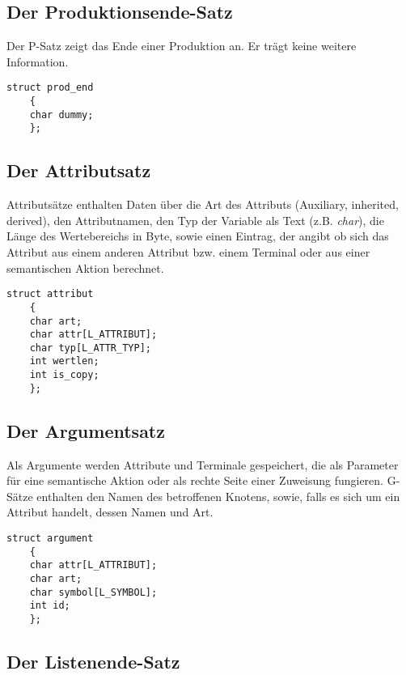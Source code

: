 \subsection{Der Produktionsende-Satz}

Der P-Satz zeigt das Ende einer Produktion an. Er tr\"agt keine weitere Information.

\begin{small}\begin{verbatim}
struct prod_end
	{
	char dummy;
	};
\end{verbatim}\end{small}

\subsection{Der Attributsatz}

Attributs\"atze enthalten Daten \"uber die Art des Attributs (Auxiliary, inherited, derived), den Attributnamen, den Typ der Variable als Text (z.B. {\it
char}), die L\"ange des Wertebereichs in Byte, sowie einen Eintrag, der angibt ob sich das Attribut aus einem anderen Attribut bzw. einem Terminal oder aus
einer semantischen Aktion berechnet.

\begin{small}\begin{verbatim}
struct attribut
	{
	char art;
	char attr[L_ATTRIBUT];
	char typ[L_ATTR_TYP];
	int wertlen;
	int is_copy;
	};
\end{verbatim}\end{small}

\subsection{Der Argumentsatz}

Als Argumente werden Attribute und Terminale gespeichert, die als Parameter f\"ur eine semantische Aktion oder als rechte Seite einer Zuweisung fungieren.
G-S\"atze enthalten den Namen des betroffenen Knotens, sowie, falls es sich um ein Attribut handelt, dessen Namen und Art.

\begin{small}\begin{verbatim}
struct argument
	{
	char attr[L_ATTRIBUT];
	char art;
	char symbol[L_SYMBOL];
	int id;
	};
\end{verbatim}\end{small}

\subsection{Der Listenende-Satz}

